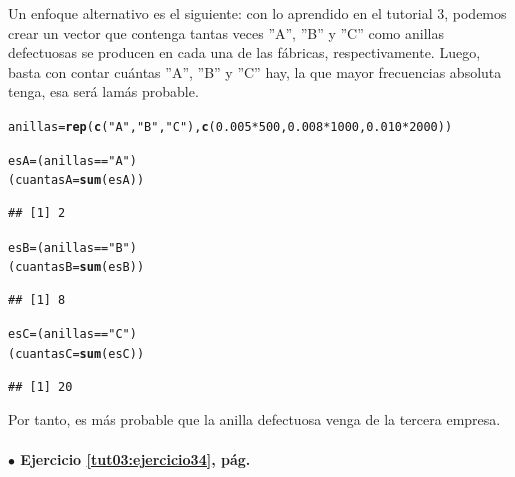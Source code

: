 \documentclass[10pt,a4paper]{article}\usepackage[]{graphicx}\usepackage[]{color}
\makeatletter
\newcommand{\hlnum}[1]{\textcolor[rgb]{0.686,0.059,0.569}{#1}}%
\newcommand{\hlstr}[1]{\textcolor[rgb]{0.192,0.494,0.8}{#1}}%
\newcommand{\hlopt}[1]{\textcolor[rgb]{0,0,0}{#1}}%
\newcommand{\hlstd}[1]{\textcolor[rgb]{0.345,0.345,0.345}{#1}}%
\newcommand{\hlkwb}[1]{\textcolor[rgb]{0.69,0.353,0.396}{#1}}%
\newcommand{\hlkwd}[1]{\textcolor[rgb]{0.737,0.353,0.396}{\textbf{#1}}}%
\newenvironment{kframe}{%
 \def\at@end@of@kframe{}%
 \ifinner\ifhmode%
  \def\at@end@of@kframe{\end{minipage}}%
  \begin{minipage}{\columnwidth}%
 \fi\fi%
 \def\FrameCommand##1{\hskip\@totalleftmargin \hskip-\fboxsep
 \colorbox{shadecolor}{##1}\hskip-\fboxsep
     \hskip-\linewidth \hskip-\@totalleftmargin \hskip\columnwidth}%
 \MakeFramed {\advance\hsize-\width
   \@totalleftmargin\z@ \linewidth\hsize
   \@setminipage}}%
 {\par\unskip\endMakeFramed%
 \at@end@of@kframe}
\newenvironment{knitrout}{}{} %
\newcounter {cont01}
\makeatother
\begin{document}
Un enfoque alternativo es el siguiente: con lo aprendido en el tutorial 3, podemos crear un vector que contenga tantas veces ''A'', ''B'' y ''C'' 
como anillas defectuosas se producen en cada una de las fábricas, respectivamente. Luego, basta con contar cuántas ''A'',  ''B'' y ''C'' hay, la que mayor frecuencias absoluta tenga, esa será lamás probable. 
\begin{knitrout}
\color{fgcolor}\begin{kframe}
\begin{alltt}
\hlstd{anillas}\hlkwb{=}\hlkwd{rep}\hlstd{(}\hlkwd{c}\hlstd{(}\hlstr{"A"}\hlstd{,}\hlstr{"B"}\hlstd{,} \hlstr{"C"}\hlstd{),}\hlkwd{c}\hlstd{(}\hlnum{0.005}\hlopt{*}\hlnum{500}\hlstd{,}\hlnum{0.008}\hlopt{*}\hlnum{1000}\hlstd{,}\hlnum{0.010}\hlopt{*}\hlnum{2000}\hlstd{))}

\hlstd{esA}\hlkwb{=} \hlstd{(anillas}\hlopt{==}\hlstr{"A"}\hlstd{)}
\hlstd{(cuantasA}\hlkwb{=}\hlkwd{sum}\hlstd{(esA))}
\end{alltt}
\begin{verbatim}
## [1] 2
\end{verbatim}
\begin{alltt}
\hlstd{esB}\hlkwb{=} \hlstd{(anillas}\hlopt{==}\hlstr{"B"}\hlstd{)}
\hlstd{(cuantasB}\hlkwb{=}\hlkwd{sum}\hlstd{(esB))}
\end{alltt}
\begin{verbatim}
## [1] 8
\end{verbatim}
\begin{alltt}
\hlstd{esC}\hlkwb{=} \hlstd{(anillas}\hlopt{==}\hlstr{"C"}\hlstd{)}
\hlstd{(cuantasC}\hlkwb{=}\hlkwd{sum}\hlstd{(esC))}
\end{alltt}
\begin{verbatim}
## [1] 20
\end{verbatim}
\end{kframe}
\end{knitrout}

Por tanto, es m\'as probable que la anilla defectuosa venga de la tercera empresa.


\paragraph{\bf $\bullet$ Ejercicio \ref{tut03:ejercicio34}, pág. \pageref{tut03:ejercicio34}}
\label{tut03:ejercicio34:sol}\quad\\
\end{document}
